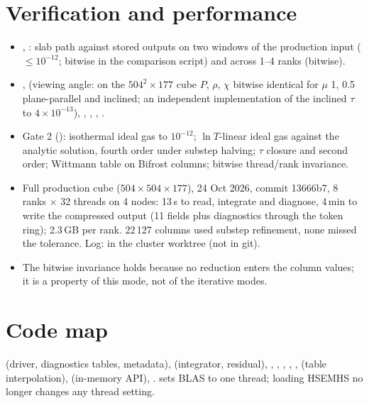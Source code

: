 \section{Verification and performance}
\begin{itemize}
\item {}, : slab path against stored  outputs on two
windows of the production input ($\le10^{-12}$; bitwise in the comparison script) and across 1--4 ranks (bitwise).
\item {},  (viewing angle: on the $504^2\times177$ cube $P$, $\rho$, $\chi$ bitwise
identical for $\mu$ 1, 0.5 plane-parallel and inclined; an independent implementation of the inclined $\tau$ to $4\times10^{-13}$),
, , , .
\item Gate 2 (): isothermal ideal gas to $10^{-12}$; $\ln T$-linear ideal gas against the
analytic solution, fourth order under substep halving; $\tau$ closure and second order; Wittmann table on Bifrost
columns; bitwise thread/rank invariance.
\item Full production cube ($504\times504\times177$), 24 Oct 2026, commit 13666b7, 8 ranks $\times$ 32 threads on 4
nodes: 13\,s to read, integrate and diagnose, 4\,min to write the compressed output (11 fields plus diagnostics through the
token ring); 2.3\,GB per rank. 22\,127 columns used substep refinement, none missed the tolerance. Log:
 in the cluster worktree  (not in git).
\item The bitwise invariance holds because no reduction enters the column values; it is a property of this mode, not of
the iterative modes.
\end{itemize}

\section{Code map}
 (driver, diagnostics tables, metadata),  (integrator, residual),
, , , , ,
 (table interpolation),  (in-memory API), .
 sets BLAS to one thread; loading HSEMHS no longer changes any thread setting.

